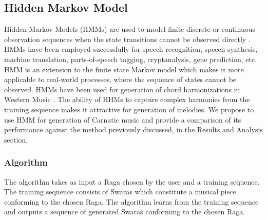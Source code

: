 \documentclass[journal]{IEEEtran}
\begin{document}
\subsection{Hidden Markov Model}
Hidden Markov Models (HMMs) are used to model finite discrete or continuous observation sequences when the state transitions cannot be observed directly \cite{stein}. HMMs have been employed successfully for speech recognition, speech synthesis, machine translation, parts-of-speech tagging, cryptanalysis, gene prediction, etc. HMM is an extension to the finite state Markov model which makes it more applicable to real-world processes, where the sequence of states cannot be observed. HMMs have been used for generation of chord harmonizations in Western Music \cite{hill}. The ability of HHMs to capture complex harmonies from the training sequence makes it attractive for generation of melodies. We propose to use HMM for generation of Carnatic music and provide a comparison of its performance against the method previously discussed, in the Results and Analysis section.

\subsubsection{Algorithm}
The algorithm takes as input a Raga chosen by the user and a training sequence. The training sequence consists of Swaras which constitute a musical piece conforming to the chosen Raga. The algorithm learns from the training sequence and outputs a sequence of generated Swaras conforming to the chosen Raga.\\
\end{document}
